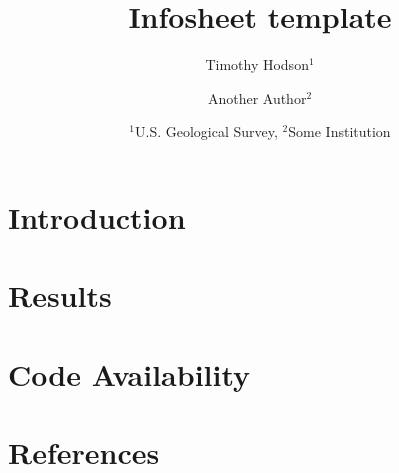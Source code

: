\documentclass{article} %
\title{Infosheet template}%
\author{Timothy Hodson$^1$ \and Another Author$^2$} %
\date{ \small
    $^1$U.S. Geological Survey, 
    $^2$Some Institution%
    }
\begin{document}
\maketitle %
\thispagestyle{firststyle}


\section*{Introduction} %
\blindtext 
\blindtext 

\section*{Results}
\blindtext 
\blindtext

\section*{Code Availability}

\section*{References} %
\end{document}

